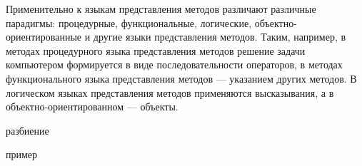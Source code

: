 Применительно к языкам представления методов различают различные парадигмы: процедурные, функциональные, логические,
объектно-ориентированные и другие языки представления методов. Таким, например, в методах процедурного языка
представления методов решение задачи компьютером формируется в виде последовательности операторов, в методах
функционального языка представления методов — указанием других методов. В логическом языках представления методов
применяются высказывания, а в объектно-ориентированном — объекты.

\begin{SCn}
\begin{scnindent}
\end{scnindent}
\begin{scnindent}
\end{scnindent}
\begin{scnindent}
    \begin{scneqtoset}
        \begin{scnindent}
            \begin{scnrelfromset}{разбиение}
            \end{scnrelfromset}
        \end{scnindent}
        \begin{scnindent}
            \begin{scnhaselementrolelist}{пример}
            \end{scnhaselementrolelist}
        \end{scnindent}
    \end{scneqtoset}
\end{scnindent}
\begin{scnindent}

\end{scnindent}
\end{SCn}
